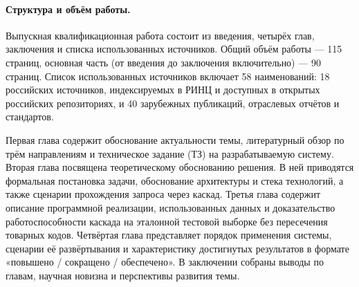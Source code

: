 \paragraph*{Структура и объём работы.}

Выпускная квалификационная работа состоит из введения, четырёх глав, заключения и списка использованных источников. Общий объём работы --- 115 страниц, основная часть (от введения до заключения включительно) --- 90 страниц. Список использованных источников включает 58 наименований: 18 российских источников, индексируемых в РИНЦ и доступных в открытых российских репозиториях, и 40 зарубежных публикаций, отраслевых отчётов и стандартов.

Первая глава содержит обоснование актуальности темы, литературный обзор по трём направлениям и техническое задание (ТЗ) на разрабатываемую систему. Вторая глава посвящена теоретическому обоснованию решения. В ней приводятся формальная постановка задачи, обоснование архитектуры и стека технологий, а также сценарии прохождения запроса через каскад. Третья глава содержит описание программной реализации, использованных данных и доказательство работоспособности каскада на эталонной тестовой выборке без пересечения товарных кодов. Четвёртая глава представляет порядок применения системы, сценарии её развёртывания и характеристику достигнутых результатов в формате «повышено / сокращено / обеспечено». В заключении собраны выводы по главам, научная новизна и перспективы развития темы.
